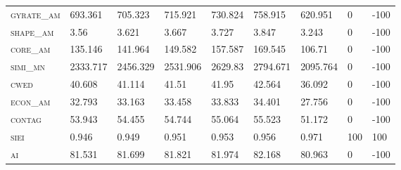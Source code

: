 \begin{table}[!htbp]
\begin{tabular}{@{}llllll|lll@{}}
\footnotesize \textsc{gyrate\_am}       & \footnotesize  693.361  & \footnotesize  705.323  & \footnotesize  715.921  & \footnotesize  730.824  & \footnotesize  758.915    & \footnotesize  620.951       & \footnotesize  0        & \footnotesize  -100 \\
\footnotesize \textsc{shape\_am}        & \footnotesize  3.56     & \footnotesize  3.621    & \footnotesize  3.667    & \footnotesize  3.727    & \footnotesize  3.847      & \footnotesize  3.243         & \footnotesize  0        & \footnotesize  -100 \\
\footnotesize \textsc{core\_am}         & \footnotesize  135.146  & \footnotesize  141.964  & \footnotesize  149.582  & \footnotesize  157.587  & \footnotesize  169.545    & \footnotesize  106.71        & \footnotesize  0        & \footnotesize  -100 \\
\footnotesize \textsc{simi\_mn}         & \footnotesize  2333.717 & \footnotesize  2456.329 & \footnotesize  2531.906 & \footnotesize  2629.83  & \footnotesize  2794.671   & \footnotesize  2095.764      & \footnotesize  0        & \footnotesize  -100 \\
\footnotesize \textsc{cwed}             & \footnotesize  40.608   & \footnotesize  41.114   & \footnotesize  41.51    & \footnotesize  41.95    & \footnotesize  42.564     & \footnotesize  36.092        & \footnotesize  0        & \footnotesize  -100 \\
\footnotesize \textsc{econ\_am}         & \footnotesize  32.793   & \footnotesize  33.163   & \footnotesize  33.458   & \footnotesize  33.833   & \footnotesize  34.401     & \footnotesize  27.756        & \footnotesize  0        & \footnotesize  -100 \\
\footnotesize \textsc{contag}           & \footnotesize  53.943   & \footnotesize  54.455   & \footnotesize  54.744   & \footnotesize  55.064   & \footnotesize  55.523     & \footnotesize  51.172        & \footnotesize  0        & \footnotesize  -100 \\
\footnotesize \textsc{siei}             & \footnotesize  0.946    & \footnotesize  0.949    & \footnotesize  0.951    & \footnotesize  0.953    & \footnotesize  0.956      & \footnotesize  0.971         & \footnotesize  100      & \footnotesize  100  \\
\footnotesize \textsc{ai}               & \footnotesize  81.531   & \footnotesize  81.699   & \footnotesize  81.821   & \footnotesize  81.974   & \footnotesize  82.168     & \footnotesize  80.963        & \footnotesize  0        & \footnotesize  -100 \\ \bottomrule
\end{tabular}
\end{table}

